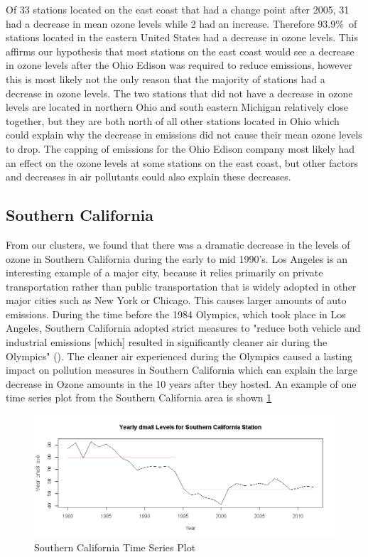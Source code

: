 \documentclass[11pt, oneside]{article}
\theoremstyle{definition}
\begin{document}
Of 33 stations located on the east coast that had a change point after 2005, 31 had a decrease in mean ozone levels while 2 had an increase. Therefore 93.9\%\ of stations located in the eastern United States had a decrease in ozone levels. This affirms our hypothesis that most stations on the east coast would see a decrease in ozone levels after the Ohio Edison was required to reduce emissions, however this is most likely not the only reason that the majority of stations had a decrease in ozone levels. The two stations that did not have a decrease in ozone levels are located in northern Ohio and south eastern Michigan relatively close together, but they are both north of all other stations located in Ohio which could explain why the decrease in emissions did not cause their mean ozone levels to drop. The capping of emissions for the Ohio Edison company most likely had an effect on the ozone levels at some stations on the east coast, but other factors and decreases in air pollutants could also explain these decreases.

\subsection{Southern California}
From our clusters, we found that there was a dramatic decrease in the levels of ozone in Southern California during the early to mid 1990's. Los Angeles is an interesting example of a major city, because it relies primarily on private transportation rather than public transportation that is widely adopted in other major cities such as New York or Chicago. This causes larger amounts of auto emissions. During the time before the 1984 Olympics, which took place in Los Angeles, Southern California adopted strict measures to "reduce both
vehicle and industrial emissions [which] resulted in significantly cleaner air during the Olympics" (\cite{parrish_xu_croes_shao_2016}). The cleaner air experienced during the Olympics caused a lasting impact on pollution measures in Southern California which can explain the large decrease in Ozone amounts in the 10 years after they hosted. An example of one time series plot from the Southern California area is shown \ref{socal_ts}

\begin{figure}[H]
    \centering
    \includegraphics[width=1\linewidth]{plots/time_series/socal_example.png}
    \caption{Southern California Time Series Plot}
    \label{socal_ts}
\end{figure}
\end{document}
